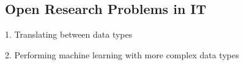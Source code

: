 \subsection{Open Research Problems in IT}

1. Translating between data types

2. Performing machine learning with more complex data types
